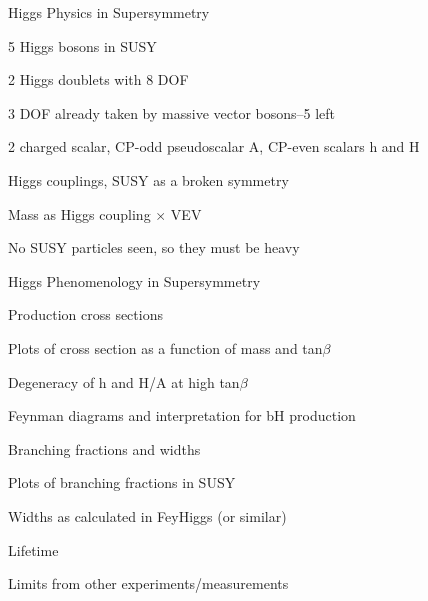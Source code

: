 \documentclass[11pt]{report}
\begin{document}
\begin{outline}
	\item Higgs Physics in Supersymmetry
	\begin{outline}
		\item 5 Higgs bosons in SUSY
		\begin{outline}
			\item 2 Higgs doublets with 8 DOF
			\item 3 DOF already taken by massive vector bosons--5 left
			\item 2 charged scalar, CP-odd pseudoscalar A, CP-even scalars h and H
		\end{outline}
		\item Higgs couplings, SUSY as a broken symmetry
		\begin{outline}
			\item Mass as Higgs coupling $\times$ VEV
			\item No SUSY particles seen, so they must be heavy
		\end{outline}
	\end{outline}
	
	\item Higgs Phenomenology in Supersymmetry
	\begin{outline}
		\item Production cross sections
		\begin{outline}
			\item Plots of cross section as a function of mass and tan$\beta$
			\item Degeneracy of h and H/A at high tan$\beta$
			\item Feynman diagrams and interpretation for bH production
		\end{outline}
		\item Branching fractions and widths
		\begin{outline}
			\item Plots of branching fractions in SUSY
			\item Widths as calculated in FeyHiggs (or similar)
			\item Lifetime
		\end{outline}
		\item Limits from other experiments/measurements
	\end{outline}

\end{outline}  
\end{document}

